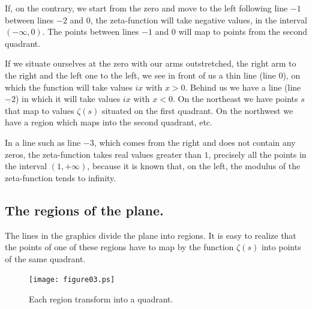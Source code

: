 \documentclass[a4paper]{amsart}
\numberwithin{equation}{section}
\begin{document}
\begin{large}
If, on the contrary, we start from the zero and move to the left
following line $-1$ between lines $-2$ and $0$, the zeta-function
will take negative values, in the interval $(-\infty, 0)$. The
points between lines $-1$ and $0$ will map to points from the
second quadrant.


If we situate ourselves at the zero with our arms outstretched, the right arm
to the right and the left one to the left, we see in front of us a thin line
(line $0$), on which the function will take values $ix$ with $x>0$. Behind us
we have a line (line $-2$) in which it will take values $ix$ with $x<0$. On the
northeast we have points $s$ that map to values $\zeta(s)$ situated on the
first quadrant. On the northwest we have a region which maps into the second
quadrant, etc.


In a line such as line $-3$, which comes from the right and does
not contain any zeros, the zeta-function takes real values greater
than $1$, precisely all the points in the interval $(1, +\infty)$,
because it is known that, on the left, the modulus of the
zeta-function tends to infinity.




\subsection{The regions of the plane.}
 The lines in the graphics divide the plane
into regions. It is easy to realize that the points of one of these regions have
to map by the function $\zeta(s)$ into points of the same quadrant.

\end{large}

\begin{figure} 
\texttt{[image: figure03.ps]}
\caption{Each region transform into a quadrant.}
\end{figure}
\end{document}
